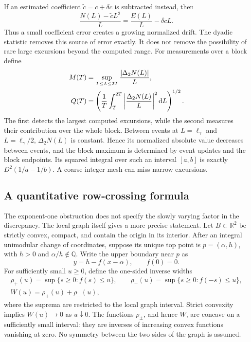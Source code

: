 \documentclass[11pt,a4paper]{article}
\numberwithin{equation}{section}
\theoremstyle{definition}
\theoremstyle{remark}
\newcommand{\dd}{\mathop{}\!\mathrm d}
\newcommand{\RR}{\mathbb R}
\begin{document}
If an estimated coefficient $\widetilde c=c+\delta c$ is subtracted
instead, then
\[
 \frac{N(L)-\widetilde cL^2}{L}
 =\frac{E(L)}L-\delta cL.
\]
Thus a small coefficient error creates a growing normalized drift. The
dyadic statistic removes this source of error exactly. It does not
remove the possibility of rare large excursions beyond the computed range.
For measurements over a block define
\begin{align}
 M(T)&=\sup_{T\le L\le2T}\frac{|\Delta_2N(L)|}{L},\notag\\
 Q(T)&=\left(\frac1T\int_T^{2T}
                    \left|\frac{\Delta_2N(L)}L\right|^2\dd L\right)^{1/2}.
 \label{eq:dyadicblockmetrics}
\end{align}
The first detects the largest computed excursions, while the second
measures their contribution over the whole block. Between events at
$L=\ell_\gamma$ and $L=\ell_\gamma/2$, $\Delta_2N(L)$ is constant.
Hence its normalized absolute value decreases between events, and
the block maximum is determined by event updates and the block endpoints.
Its squared integral over such an interval $[a,b]$ is exactly
$D^2(1/a-1/b)$. A coarse integer mesh can miss narrow excursions.


\subsection{A quantitative row-crossing formula}
\label{subsec:inverseflatness}

The exponent-one obstruction does not specify the slowly varying factor
in the discrepancy. The local graph itself gives a more precise statement.
Let $B\subset\RR^2$ be strictly convex, compact, and contain the origin in
its interior. After an integral unimodular change of coordinates, suppose
its unique top point is $p=(\alpha,h)$, with $h>0$ and
$\alpha/h\notin\mathbb Q$. Write the upper boundary near $p$ as
\[
 y=h-f(x-\alpha),\qquad f(0)=0.
\]
For sufficiently small $u\geq0$, define the one-sided inverse widths
\[
\begin{gathered}
 \rho_+(u)=\sup\{s\geq0:f(s)\leq u\},\qquad
 \rho_-(u)=\sup\{s\geq0:f(-s)\leq u\},\\
 W(u)=\rho_+(u)+\rho_-(u),
\end{gathered}
\]
where the suprema are restricted to the local graph interval. Strict
convexity implies $W(u)\to0$ as $u\downarrow0$. The functions
$\rho_\pm$, and hence $W$, are concave on a sufficiently small interval:
they are inverses of increasing convex functions vanishing at zero.
No symmetry between the two sides of the graph is assumed.
\end{document}
